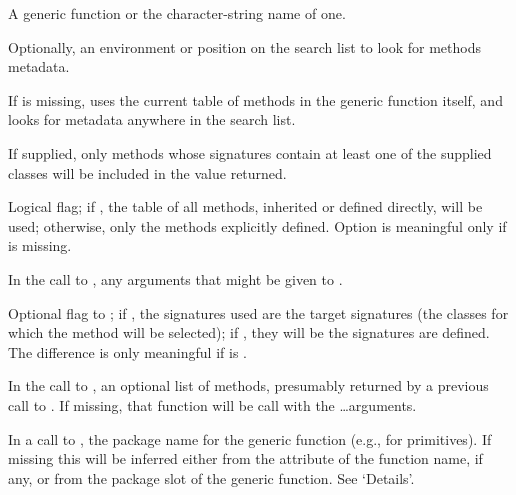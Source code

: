 \begin{Arguments}
\begin{ldescription}
\item[\code{f}] A generic function or the character-string name of one.
\item[\code{where}] Optionally, an environment or position on the search list
to look for methods metadata.

If  is missing,   uses the current
table of methods in the generic function itself, and
 looks for metadata anywhere in the search list.

\item[\code{classes}] If supplied, only methods whose signatures contain at
least one of the supplied classes will be included in the value
returned.
\item[\code{inherited}] Logical flag; if , the table of all
methods, inherited or defined directly, will be used; otherwise,
only the methods explicitly defined.  Option  is
meaningful only if  is missing.

\item[\code{...}] In the call to , any arguments
that might be given to .
\item[\code{target}] Optional flag to ; if
, the signatures used are the target signatures (the
classes for which the method will be selected); if ,
they will be the signatures are defined.  The difference is only
meaningful if  is .
\item[\code{methods}] In the call to , an optional
list of methods, presumably returned by a previous call to
.  If missing, that function will be call with the
\dots arguments.

\item[\code{package}] In a call to , the package name for
the generic function (e.g.,  for primitives).  If
missing this will be inferred either from the 
attribute of the function name, if any, or from the package slot of
the generic function.  See `Details'.
\end{ldescription}
\end{Arguments}
%
